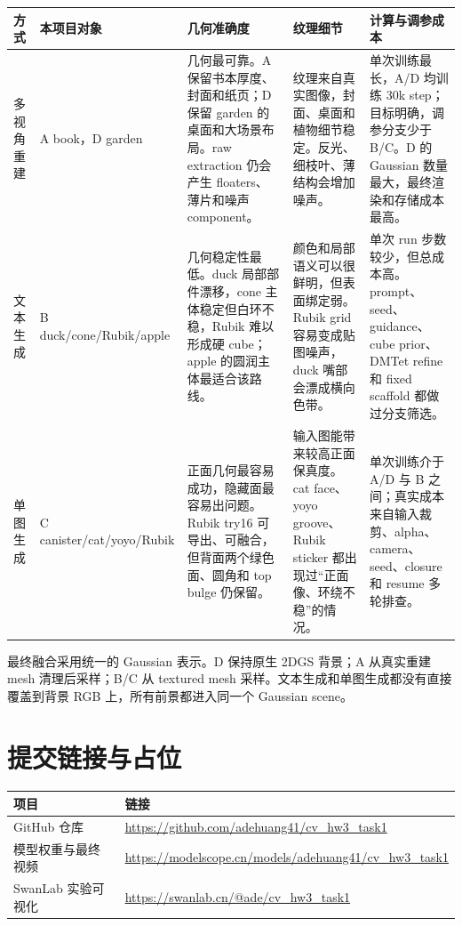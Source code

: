 \documentclass[UTF8,10pt,a4paper]{ctexart}
\renewcommand{\arraystretch}{1.10}
\let\latexcenter\center
\let\endlatexcenter\endcenter
\renewenvironment{center}{%
  \setlength{\topsep}{0.35em plus 0.08em minus 0.08em}%
  \setlength{\partopsep}{0pt}%
  \latexcenter
}{\endlatexcenter}
\begin{document}
\begin{center}
\label{tab:method_comparison}
\scriptsize
\renewcommand{\arraystretch}{1.08}
\begin{tabularx}{\textwidth}{p{} p{} X X X}
\toprule
方式 & 本项目对象 & 几何准确度 & 纹理细节 & 计算与调参成本 \\
\midrule
多视角重建 & A book，D garden & 几何最可靠。A 保留书本厚度、封面和纸页；D 保留 garden 的桌面和大场景布局。raw extraction 仍会产生 floaters、薄片和噪声 component。 & 纹理来自真实图像，封面、桌面和植物细节稳定。反光、细枝叶、薄结构会增加噪声。 & 单次训练最长，A/D 均训练 30k step；目标明确，调参分支少于 B/C。D 的 Gaussian 数量最大，最终渲染和存储成本最高。 \\
文本生成 & B duck/cone/Rubik/apple & 几何稳定性最低。duck 局部部件漂移，cone 主体稳定但白环不稳，Rubik 难以形成硬 cube；apple 的圆润主体最适合该路线。 & 颜色和局部语义可以很鲜明，但表面绑定弱。Rubik grid 容易变成贴图噪声，duck 嘴部会漂成横向色带。 & 单次 run 步数较少，但总成本高。prompt、seed、guidance、cube prior、DMTet refine 和 fixed scaffold 都做过分支筛选。 \\
单图生成 & C canister/cat/yoyo/Rubik & 正面几何最容易成功，隐藏面最容易出问题。Rubik try16 可导出、可融合，但背面两个绿色面、圆角和 top bulge 仍保留。 & 输入图能带来较高正面保真度。cat face、yoyo groove、Rubik sticker 都出现过“正面像、环绕不稳”的情况。 & 单次训练介于 A/D 与 B 之间；真实成本来自输入裁剪、alpha、camera、seed、closure 和 resume 多轮排查。 \\
\bottomrule
\end{tabularx}
\end{center}

最终融合采用统一的 Gaussian 表示。D 保持原生 2DGS 背景；A 从真实重建 mesh 清理后采样；B/C 从 textured mesh 采样。文本生成和单图生成都没有直接覆盖到背景 RGB 上，所有前景都进入同一个 Gaussian scene。

\section{提交链接与占位}

\begin{center}
\small
\begin{tabularx}{\textwidth}{p{} X}
\toprule
项目 & 链接 \\
\midrule
GitHub 仓库 & \url{https://github.com/adehuang41/cv_hw3_task1} \\
模型权重与最终视频 & \url{https://modelscope.cn/models/adehuang41/cv_hw3_task1} \\
SwanLab 实验可视化 & \url{https://swanlab.cn/@ade/cv_hw3_task1} \\
\bottomrule
\end{tabularx}
\end{center}
\end{document}
